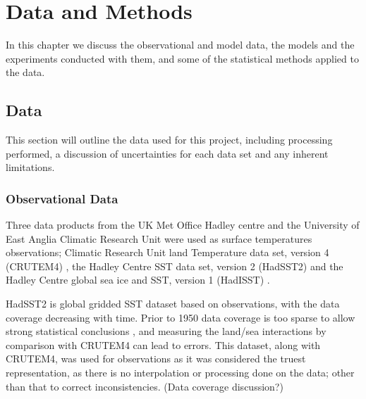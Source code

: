 \chapter{Data and Methods} %

\label{methods} %


In this chapter we discuss the observational and model data, the models and the 
experiments conducted with them, and some of the statistical methods applied to 
the data.


\section{Data}

This section will outline the data used for this project, including processing 
performed, a discussion of uncertainties for each data set and any inherent 
limitations.

\subsection{Observational Data}

Three data products from the UK Met Office Hadley centre and the University of 
East Anglia Climatic Research Unit were used as surface temperatures 
observations; Climatic Research Unit land Temperature data set, version 
4 (CRUTEM4) \citep{Brohan2006}, the Hadley Centre SST data set,
version 2 (HadSST2) \citep{Rayner2006} and the Hadley Centre global sea ice and 
SST, version 1 (HadISST) \citep{Rayner2003}. 

HadSST2 is global gridded SST dataset based on observations, with the data 
coverage decreasing with time. Prior to 1950 data coverage is too sparse to 
allow strong statistical conclusions \citep{Dommenget2009}, and measuring the 
land/sea interactions by comparison with CRUTEM4 can lead to errors. This 
dataset, along with CRUTEM4, was used for observations as it was considered the 
truest representation, as there is no interpolation or processing done on the 
data; other than that to correct inconsistencies. (Data coverage discussion?)

